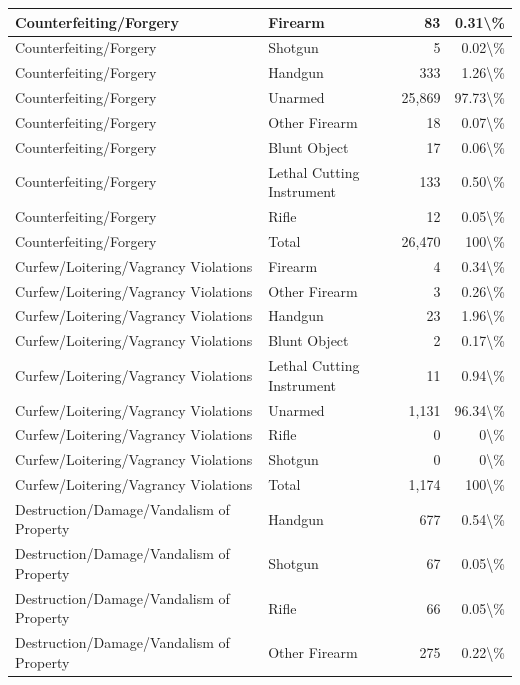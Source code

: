 \documentclass[
]{krantz}
\begin{document}
\begin{longtable}[t]{l|l|r|r}
\hline
Counterfeiting/Forgery & Firearm & 83 & 0.31\textbackslash{}\%\\
\hline
Counterfeiting/Forgery & Shotgun & 5 & 0.02\textbackslash{}\%\\
\hline
Counterfeiting/Forgery & Handgun & 333 & 1.26\textbackslash{}\%\\
\hline
Counterfeiting/Forgery & Unarmed & 25,869 & 97.73\textbackslash{}\%\\
\hline
Counterfeiting/Forgery & Other Firearm & 18 & 0.07\textbackslash{}\%\\
\hline
Counterfeiting/Forgery & Blunt Object & 17 & 0.06\textbackslash{}\%\\
\hline
Counterfeiting/Forgery & Lethal Cutting Instrument & 133 & 0.50\textbackslash{}\%\\
\hline
Counterfeiting/Forgery & Rifle & 12 & 0.05\textbackslash{}\%\\
\hline
Counterfeiting/Forgery & Total & 26,470 & 100\textbackslash{}\%\\
\hline
Curfew/Loitering/Vagrancy Violations & Firearm & 4 & 0.34\textbackslash{}\%\\
\hline
Curfew/Loitering/Vagrancy Violations & Other Firearm & 3 & 0.26\textbackslash{}\%\\
\hline
Curfew/Loitering/Vagrancy Violations & Handgun & 23 & 1.96\textbackslash{}\%\\
\hline
Curfew/Loitering/Vagrancy Violations & Blunt Object & 2 & 0.17\textbackslash{}\%\\
\hline
Curfew/Loitering/Vagrancy Violations & Lethal Cutting Instrument & 11 & 0.94\textbackslash{}\%\\
\hline
Curfew/Loitering/Vagrancy Violations & Unarmed & 1,131 & 96.34\textbackslash{}\%\\
\hline
Curfew/Loitering/Vagrancy Violations & Rifle & 0 & 0\textbackslash{}\%\\
\hline
Curfew/Loitering/Vagrancy Violations & Shotgun & 0 & 0\textbackslash{}\%\\
\hline
Curfew/Loitering/Vagrancy Violations & Total & 1,174 & 100\textbackslash{}\%\\
\hline
Destruction/Damage/Vandalism of Property & Handgun & 677 & 0.54\textbackslash{}\%\\
\hline
Destruction/Damage/Vandalism of Property & Shotgun & 67 & 0.05\textbackslash{}\%\\
\hline
Destruction/Damage/Vandalism of Property & Rifle & 66 & 0.05\textbackslash{}\%\\
\hline
Destruction/Damage/Vandalism of Property & Other Firearm & 275 & 0.22\textbackslash{}\%\\

\end{longtable}
\end{document}
